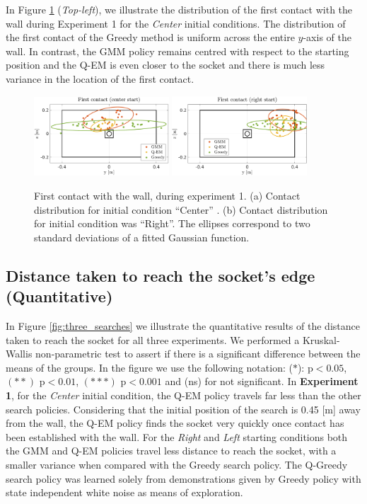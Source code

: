 In Figure \ref{fig:first_contact} (\textit{Top-left}), we illustrate the distribution of the first contact with the wall 
during Experiment 1 for the \textit{Center} initial conditions. The distribution of the first contact of the Greedy method is uniform across 
the entire $y$-axis of the wall. In contrast, the GMM policy remains centred with respect to the starting position and the Q-EM is even closer to the socket and 
there is much less variance in the location of the first contact.

\begin{figure}
  \centering
   \includegraphics[width=0.45\textwidth]{./ch4-PiH/Figures/Fig/first_contact_center.pdf}
   \includegraphics[width=0.45\textwidth]{./ch4-PiH/Figures/Fig/first_contact_right.pdf}
   \caption{First contact with the wall, during experiment 1. (a) Contact distribution for initial condition ``Center'' . (b) 
   Contact distribution for initial condition was ``Right''. The ellipses correspond to two standard deviations of a fitted Gaussian 
   function.}
   \label{fig:first_contact}
\end{figure}

\subsection{Distance taken to reach the socket's edge (Quantitative)}

In Figure \ref{fig:three_searches} we illustrate the quantitative results of the distance taken 
to reach the socket for all three experiments. We performed a Kruskal-Wallis non-parametric test 
to assert if there is a significant difference between the means of the groups. In the figure we use the following 
notation: ($\ast$): ${\mathrm{p} < 0.05}$, $(\ast\ast)$ ${\mathrm{p} < 0.01}$,  $(\ast\ast\ast)$ ${\mathrm{p} < 0.001}$ and (ns) for not significant.
In \textbf{Experiment 1}, for the \textit{Center} initial condition,
the Q-EM policy travels far less than the other search policies. Considering that the initial position of the search is 
0.45 [m] away from the wall, the Q-EM policy finds the socket very quickly once contact has been established with the wall. 
For the \textit{Right} and \textit{Left} starting conditions both the GMM and Q-EM policies travel less distance to reach the socket, with a 
smaller variance when compared with the Greedy search policy. The Q-Greedy search policy was learned solely from demonstrations given by 
Greedy policy with state independent white noise as means of exploration.

